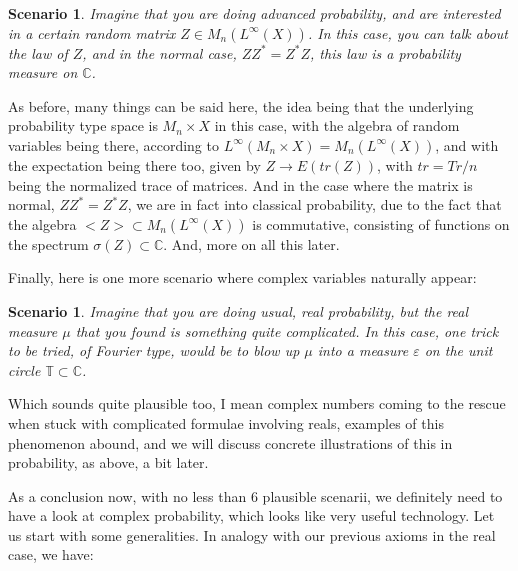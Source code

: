 \documentclass[12pt]{amsbook}
\newtheorem{scenario}[theorem]{Scenario}
\begin{document}
\begin{scenario}
Imagine that you are doing advanced probability, and are interested in a certain random matrix $Z\in M_n(L^\infty(X))$. In this case, you can talk about the law of $Z$, and in the  normal case, $ZZ^*=Z^*Z$, this law is a probability measure on $\mathbb C$.
\end{scenario}

As before, many things can be said here, the idea being that the underlying probability type space is $M_n\times X$ in this case, with the algebra of random variables being there, according to $L^\infty(M_n\times X)=M_n(L^\infty(X))$, and with the expectation being there too, given by $Z\to E(tr(Z))$, with $tr=Tr/n$ being the normalized trace of matrices. And in the case where the matrix is normal, $ZZ^*=Z^*Z$, we are in fact into classical probability, due to the fact that the algebra $<Z>\subset M_n(L^\infty(X))$ is commutative, consisting of functions on the spectrum $\sigma(Z)\subset\mathbb C$. And, more on all this later.

\bigskip

Finally, here is one more scenario where complex variables naturally appear:

\begin{scenario}
Imagine that you are doing usual, real probability, but the real measure $\mu$ that you found is something quite complicated. In this case, one trick to be tried, of Fourier type, would be to blow up $\mu$ into a measure $\varepsilon$ on the unit circle $\mathbb T\subset\mathbb C$.
\end{scenario}

Which sounds quite plausible too, I mean complex numbers coming to the rescue when stuck with complicated formulae involving reals, examples of this phenomenon abound, and we will discuss concrete illustrations of this in probability, as above, a bit later. 

\bigskip

As a conclusion now, with no less than 6 plausible scenarii, we definitely need to have a look at complex probability, which looks like very useful technology. Let us start with some generalities. In analogy with our previous axioms in the real case, we have:
\end{document}
